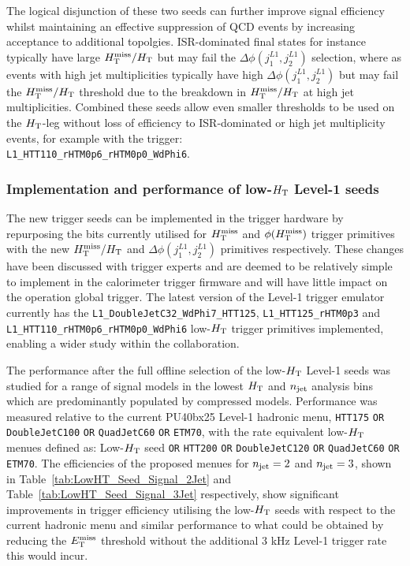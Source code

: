 The logical disjunction of these two seeds can further improve signal efficiency whilst maintaining an effective suppression of QCD events by increasing acceptance to additional topolgies. ISR-dominated final states for instance typically have large $\mbox{$H_{\rm T}^{\rm miss}$}/\mbox{$H_\text{T}$}$ but may fail the $\Delta\phi(j_{1}^{L1},j_{2}^{L1})$ selection, where as events with high jet multiplicities typically have high $\Delta\phi(j_{1}^{L1},j_{2}^{L1})$ but may fail the $\mbox{$H_{\rm T}^{\rm miss}$}/\mbox{$H_\text{T}$}$ threshold due to the breakdown in $\mbox{$H_{\rm T}^{\rm miss}$}/\mbox{$H_\text{T}$}$ at high jet multiplicities. Combined these seeds allow even smaller thresholds to be used on the $\mbox{$H_\text{T}$}$-leg without loss of efficiency to ISR-dominated or high jet multiplicity events, for example with the trigger:\\ \verb!L1_HTT110_rHTM0p6_rHTM0p0_WdPhi6!.


\subsubsection{Implementation and performance of low-$\mbox{$H_\text{T}$}$ Level-1 seeds}

The new trigger seeds can be implemented in the trigger hardware by repurposing the bits currently utilised for $\mbox{$H_{\rm T}^{\rm miss}$}$ and $\phi({\mbox{$H_{\rm T}^{\rm miss}$}})$ trigger primitives with the new $\mbox{$H_{\rm T}^{\rm miss}$}/\mbox{$H_\text{T}$}$ and $\Delta\phi(j_{1}^{L1},j_{2}^{L1})$ primitives respectively. These changes have been discussed with trigger experts and are deemed to be relatively simple to implement in the calorimeter trigger firmware and will have little impact on the operation global trigger. The latest version of the Level-1 trigger emulator currently has the \verb!L1_DoubleJetC32_WdPhi7_HTT125!, \verb!L1_HTT125_rHTM0p3! and \\ \verb!L1_HTT110_rHTM0p6_rHTM0p0_WdPhi6! low-$\mbox{$H_\text{T}$}$ trigger primitives implemented, enabling a wider study within the collaboration.

The performance after the full offline selection of the low-$\mbox{$H_\text{T}$}$ Level-1 seeds was studied for a range of signal models in the lowest $\mbox{$H_\text{T}$}$ and $n_{\text{jet}}$ analysis bins which are predominantly populated by compressed models. Performance was measured relative to the current PU40bx25 Level-1 hadronic menu, {\verb!HTT175! \verb!OR! \verb!DoubleJetC100! \verb!OR! \verb!QuadJetC60! \verb!OR! \verb!ETM70!}, with the rate equivalent low-$\mbox{$H_\text{T}$}$ menues defined as: Low-$\mbox{$H_\text{T}$}$ seed {\verb!OR! \verb!HTT200! \verb!OR! \verb!DoubleJetC120! \verb!OR! \verb!QuadJetC60! \verb!OR! \verb!ETM70!}. The efficiencies of the proposed menues for $n_{\text{jet}} = 2$ and $n_{\text{jet}} = 3$, shown in Table~\ref{tab:LowHT_Seed_Signal_2Jet} and Table~\ref{tab:LowHT_Seed_Signal_3Jet} respectively, show significant improvements in trigger efficiency utilising the low-$\mbox{$H_\text{T}$}$ seeds with respect to the current hadronic menu and similar performance to what could be obtained by reducing the $\mbox{$E_\text{T}^{\rm miss}$}$ threshold without the additional 3 kHz Level-1 trigger rate this would incur.


